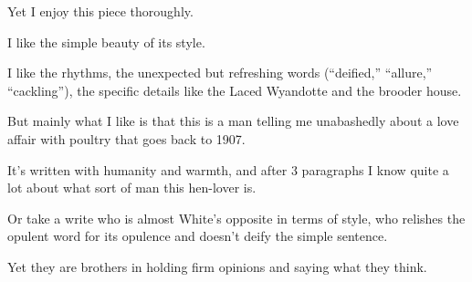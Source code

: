 \documentclass{book}
\numberwithin{equation}{section}
\begin{document}
Yet I enjoy this piece thoroughly.

I like the simple beauty of its style.

I like the rhythms, the unexpected but refreshing words (``deified,'' ``allure,'' ``cackling''), the specific details like the Laced Wyandotte and the brooder house.

But mainly what I like is that this is a man telling me unabashedly about a love affair with poultry that goes back to 1907.

It's written with humanity and warmth, and after 3 paragraphs I know quite a lot about what sort of man this hen-lover is.

%
Or take a write who is almost White's opposite in terms of style, who relishes the opulent word for its opulence and doesn't deify the simple sentence.

Yet they are brothers in holding firm opinions and saying what they think.
\end{document}
